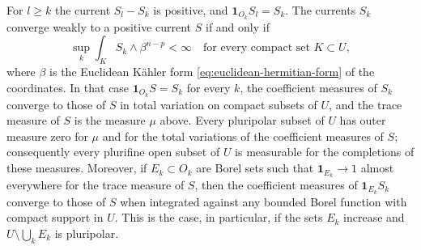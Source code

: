 \begin{lemma}\label{lem:nonpluripolar-truncation-limit}
For $l\geq k$ the current $S_l-S_k$ is positive, and $\mathbf1_{O_k}S_l=S_k$. The currents $S_k$ converge weakly to a positive current $S$ if and only if
\begin{equation}\label{eq:nonpluripolar-local-mass-condition}
 \sup_k\int_K S_k\wedge\beta^{n-p}<\infty
 \quad\text{for every compact set }K\subset U,
\end{equation}
where $\beta$ is the Euclidean K\"ahler form \eqref{eq:euclidean-hermitian-form} of the coordinates. In that case $\mathbf1_{O_k}S=S_k$ for every $k$, the coefficient measures of $S_k$ converge to those of $S$ in total variation on compact subsets of $U$, and the trace measure of $S$ is the measure $\mu$ above. Every pluripolar subset of $U$ has outer measure zero for $\mu$ and for the total variations of the coefficient measures of $S$; consequently every plurifine open subset of $U$ is measurable for the completions of these measures. Moreover, if $E_k\subset O_k$ are Borel sets such that $\mathbf1_{E_k}\to1$ almost everywhere for the trace measure of $S$, then the coefficient measures of $\mathbf1_{E_k}S_k$ converge to those of $S$ when integrated against any bounded Borel function with compact support in $U$. This is the case, in particular, if the sets $E_k$ increase and $U\setminus\bigcup_kE_k$ is pluripolar.
\end{lemma}
